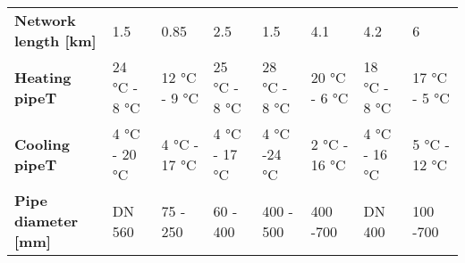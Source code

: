 \begin{landscape}
\begin{table}[h]
\begin{tabular}{llllllll}
\midrule
\textbf{Network length [km]}                                                   & 1.5                                                                                & 0.85                                                                        & 2.5                                                                                                   & 1.5                                                                               & 4.1                                                                      & 4.2                                                                   & 6                                                                             \\
\textbf{Heating pipeT}                                                         & 24 \si{\celsius} - 8 \si{\celsius}                                                                       & 12 \si{\celsius} - 9 \si{\celsius}                                                                & 25 \si{\celsius} - 8 \si{\celsius}                                                                                          & 28 \si{\celsius} - 8 \si{\celsius}                                                                      & 20 \si{\celsius} - 6 \si{\celsius}                                                             & 18 \si{\celsius} - 8 \si{\celsius}                                                          & 17 \si{\celsius} - 5 \si{\celsius}                                                                  \\
\textbf{Cooling pipeT}                                                         & 4 \si{\celsius} - 20 \si{\celsius}                                                                       & 4 \si{\celsius} - 17 \si{\celsius}                                                                & 4 \si{\celsius} - 17 \si{\celsius}                                                                                          & 4 \si{\celsius} -24 \si{\celsius}                                                                       & 2 \si{\celsius} - 16 \si{\celsius}                                                             & 4 \si{\celsius} - 16 \si{\celsius}                                                          & 5 \si{\celsius} - 12 \si{\celsius}                                                                  \\
\textbf{Pipe diameter [mm]}                                                    & DN 560                                                                             & 75 - 250                                                                    & 60 - 400                                                                                              & 400 - 500                                                                         & 400 -700                                                                 & DN 400                                                                & 100 -700                                                                      \\

\end{tabular}
\end{table}
\end{landscape}
